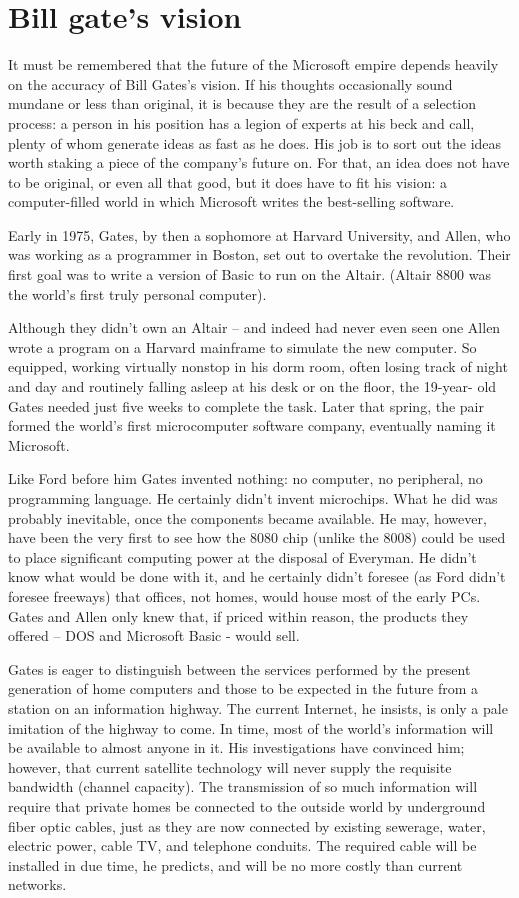 \section{Bill gate's vision}
It must be remembered that the future of the Microsoft empire depends heavily on the accuracy of Bill Gates's vision. If his thoughts occasionally sound mundane or less than original, it is because they are the result of a selection process: a person in his position has a legion of experts at his beck and call, plenty of whom generate ideas as fast as he does. His job is to sort out the ideas worth staking a piece of the company's future on. For that, an idea does not have to be original, or even all that good, but it does have to fit his vision: a computer-filled world in which Microsoft writes the best-selling software.


Early in 1975, Gates, by then a sophomore at Harvard University, and Allen, who was working as a programmer in Boston, set out to overtake the revolution. Their first goal was to write a version of Basic to run on the Altair. (Altair 8800 was the world's first truly personal computer).


Although they didn't own an Altair -- and indeed had never even seen one Allen wrote a program on a Harvard mainframe to simulate the new computer. So equipped, working virtually nonstop in his dorm room, often losing track of night and day and routinely falling asleep at his desk or on the floor, the 19-year- old Gates needed just five weeks to complete the task. Later that spring, the pair formed the world's first microcomputer software company, eventually naming it Microsoft.


Like Ford before him Gates invented nothing: no computer, no peripheral, no programming language. He certainly didn't invent microchips. What he did was probably inevitable, once the components became available. He may, however, have been the very first to see how the 8080 chip (unlike the 8008) could be used to place significant computing power at the disposal of Everyman. He didn't know what would be done with it, and he certainly didn't foresee (as Ford didn't foresee freeways) that offices, not homes, would house most of the early PCs. Gates and Allen only knew that, if priced within reason, the products they offered -- DOS and Microsoft Basic - would sell.


Gates is eager to distinguish between the services performed by the present generation of home computers and those to be expected in the future from a station on an information highway. The current Internet, he insists, is only a pale imitation of the highway to come. In time, most of the world's information will be available to almost anyone in it. His investigations have convinced him; however, that current satellite technology will never supply the requisite bandwidth (channel capacity). The transmission of so much information will require that private homes be connected to the outside world by underground fiber optic cables, just as they are now connected by existing sewerage, water, electric power, cable TV, and telephone conduits. The required cable will be installed in due time, he predicts, and will be no more costly than current networks.


